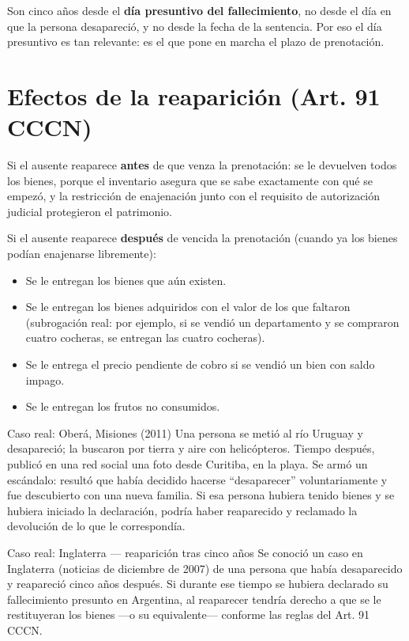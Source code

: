 \documentclass[12pt,oneside]{book}
\begin{document}
\begin{important}
Son cinco años desde el \textbf{día presuntivo del fallecimiento}, no
desde el día en que la persona desapareció, y no desde la fecha de la
sentencia. Por eso el día presuntivo es tan relevante: es el que pone en
marcha el plazo de prenotación.
\end{important}

\section{Efectos de la reaparición (Art. 91 CCCN)}

Si el ausente reaparece \textbf{antes} de que venza la prenotación: se le
devuelven todos los bienes, porque el inventario asegura que se sabe
exactamente con qué se empezó, y la restricción de enajenación junto con
el requisito de autorización judicial protegieron el patrimonio.

Si el ausente reaparece \textbf{después} de vencida la prenotación
(cuando ya los bienes podían enajenarse libremente):

\begin{itemize}
    \item Se le entregan los bienes que aún existen.
    \item Se le entregan los bienes adquiridos con el valor de los que faltaron (subrogación real: por ejemplo, si se vendió un departamento y se compraron cuatro cocheras, se entregan las cuatro cocheras).
    \item Se le entrega el precio pendiente de cobro si se vendió un bien con saldo impago.
    \item Se le entregan los frutos no consumidos.
\end{itemize}

\begin{example}{Caso real: Oberá, Misiones (2011)}
Una persona se metió al río Uruguay y desapareció; la buscaron por tierra
y aire con helicópteros. Tiempo después, publicó en una red social una
foto desde Curitiba, en la playa. Se armó un escándalo: resultó que había
decidido hacerse ``desaparecer'' voluntariamente y fue descubierto con
una nueva familia. Si esa persona hubiera tenido bienes y se hubiera
iniciado la declaración, podría haber reaparecido y reclamado la
devolución de lo que le correspondía.
\end{example}

\begin{example}{Caso real: Inglaterra — reaparición tras cinco años}
Se conoció un caso en Inglaterra (noticias de diciembre de 2007) de una
persona que había desaparecido y reapareció cinco años después. Si
durante ese tiempo se hubiera declarado su fallecimiento presunto en
Argentina, al reaparecer tendría derecho a que se le restituyeran los
bienes —o su equivalente— conforme las reglas del Art. 91 CCCN.
\end{example}
\end{document}

